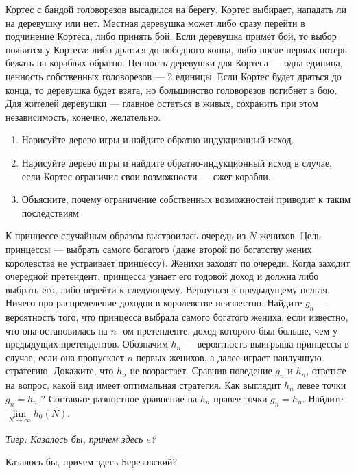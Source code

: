 \begin{problem}[Кортес {[О]}]\par
Кортес с бандой головорезов высадился на берегу. Кортес выбирает, нападать ли на деревушку или нет. Местная деревушка может либо сразу перейти в подчинение Кортеса, либо принять бой. Если деревушка примет бой, то выбор появится у Кортеса: либо драться до победного конца, либо после первых потерь бежать на кораблях обратно. Ценность деревушки для Кортеса --- одна единица, ценность собственных головорезов --- 2 единицы. Если Кортес будет драться до конца, то деревушка будет взята, но большинство головорезов погибнет в бою. Для жителей деревушки --- главное остаться в живых, сохранить при этом независимость, конечно, желательно.\par
\begin{enumerate}
\item  Нарисуйте дерево игры и найдите обратно-индукционный исход.\par
\item Нарисуйте дерево игры и найдите обратно-индукционный исход в случае, если Кортес ограничил свои возможности --- сжег корабли.\par
\item  Объясните, почему ограничение собственных возможностей приводит к таким последствиям \par
\end{enumerate}


\begin{sol}

\end{sol}
\end{problem}



\begin{problem}
К принцессе случайным образом выстроилась очередь из  $N$  женихов. Цель принцессы --- выбрать самого богатого (даже второй по богатству жених королевства не устраивает принцессу). Женихи заходят по очереди. Когда заходит очередной претендент, принцесса узнает его годовой доход и должна либо выбрать его, либо перейти к следующему. Вернуться к предыдущему нельзя. Ничего про распределение доходов в королевстве неизвестно.
Найдите  $g_{n} $  --- вероятность того, что принцесса выбрала самого богатого жениха, если известно, что она остановилась на  $n$ -ом претенденте, доход которого был больше, чем у предыдущих претендентов.
Обозначим  $h_{n} $  --- вероятность выигрыша принцессы в случае, если она пропускает  $n$  первых женихов, а далее играет наилучшую стратегию. Докажите, что  $h_{n} $  не возрастает. Сравнив поведение  $g_{n} $  и  $h_{n} $, ответьте на вопрос, какой вид имеет оптимальная стратегия. Как выглядит  $h_{n} $  левее точки  $g_{n} =h_{n} $ ? Составьте разностное уравнение на  $h_{n} $  правее точки  $g_{n} =h_{n} $.
Найдите  $\mathop{\lim }\limits_{N\to \infty } h_{0} \left(N\right)$.
{\it Тигр: Казалось бы, причем здесь  $e$? \par
Казалось бы, причем здесь Березовский?}
\begin{sol}
\end{sol}
\end{problem}




